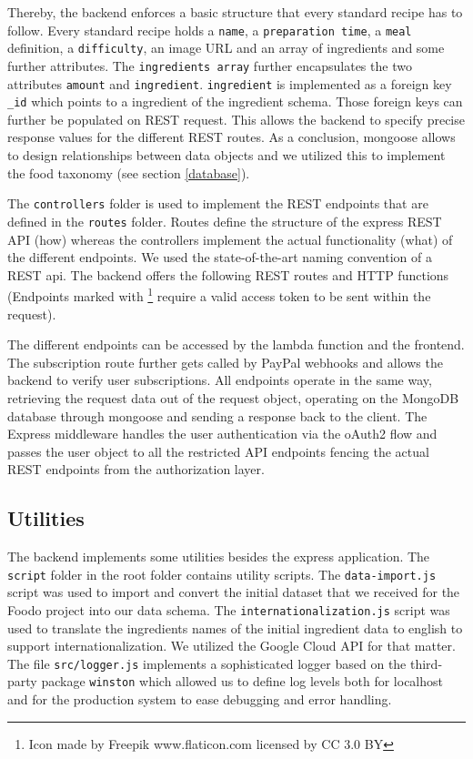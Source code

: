 Thereby, the backend enforces a basic structure that every standard recipe has to follow. Every standard recipe holds a \texttt{name}, a \texttt{preparation time}, a \texttt{meal} definition, a \texttt{difficulty}, an image URL and an array of ingredients and some further attributes. The \texttt{ingredients array} further encapsulates the two attributes \texttt{amount} and \texttt{ingredient}. \texttt{ingredient} is implemented as a foreign key \texttt{\_id} which points to a ingredient of the ingredient schema. Those foreign keys can further be populated on REST request. This allows the backend to specify precise response values for the different REST routes.  As a conclusion, mongoose allows to design relationships between data objects and we utilized this to implement the food taxonomy (see section \ref{database}).

The \texttt{controllers} folder is used to implement the REST endpoints that are defined in the \texttt{routes} folder. Routes define the structure of the express REST API (how) whereas the controllers implement the actual functionality (what) of the different endpoints. We used the state-of-the-art naming convention of a REST api. The backend offers the following REST routes and HTTP functions (Endpoints marked with \lockicon\footnote{Icon made by Freepik www.flaticon.com licensed by CC 3.0 BY} require a valid access token to be sent within the request).



The different endpoints can be accessed by the lambda function and the frontend. The subscription route further gets called by PayPal webhooks and allows the backend to verify user subscriptions. All endpoints operate in the same way, retrieving the request data out of the request object, operating on the MongoDB database through mongoose and sending a response back to the client. The Express middleware handles the user authentication via the oAuth2 flow and passes the user object to all the restricted API endpoints fencing the actual REST endpoints from the authorization layer. 
\clearpage

\subsection*{Utilities}
The backend implements some utilities besides the express application. The \texttt{script} folder in the root folder contains utility scripts. The \texttt{data-import.js} script was used to import and convert the initial dataset that we received for the Foodo project into our data schema. The \texttt{internationalization.js} script was used to translate the ingredients names of the initial ingredient data to english to support internationalization. We utilized the Google Cloud API for that matter. The file \texttt{src/logger.js} implements a sophisticated logger based on the third-party package \texttt{winston} which allowed us to define log levels both for localhost and for the production system to ease debugging and error handling. 

